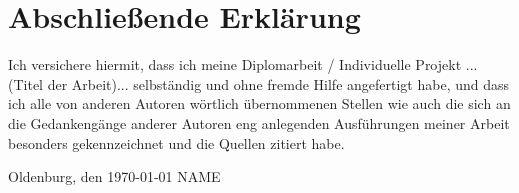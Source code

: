 \documentclass[11pt]{scrartcl}
\begin{document}
\newpage
\section*{Abschließende Erklärung}

Ich versichere hiermit, dass ich meine Diplomarbeit / Individuelle Projekt ...(Titel der Arbeit)... selbständig und ohne fremde Hilfe angefertigt habe, und dass ich alle von anderen Autoren wörtlich übernommenen Stellen wie auch die sich an die Gedankengänge anderer Autoren eng anlegenden Ausführungen meiner Arbeit besonders gekennzeichnet und die Quellen zitiert habe.

\vspace*{3cm}
\noindent Oldenburg, den \today \hspace*{2cm} NAME
\end{document}
